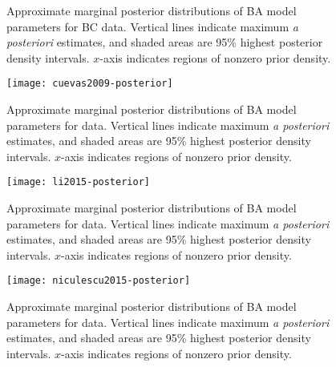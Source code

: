 \clearpage

\begin{figure}[ht]
  \caption[
      Approximate marginal posterior distributions of BA model parameters for
      BC data.
  ]
  {
      Approximate marginal posterior distributions of BA model parameters for
      BC data. Vertical lines indicate maximum \textit{a posteriori} estimates,
      and shaded areas are 95\% highest posterior density intervals. $x$-axis
      indicates regions of nonzero prior density.
  }
  \label{fig:bctree}
\end{figure}

\begin{figure}[ht]
  \texttt{[image: cuevas2009-posterior]}
  \caption[
      Approximate marginal posterior distributions of BA model parameters for
      \textcite{cuevas2009hiv} data. 
  ]{
      Approximate marginal posterior distributions of BA model parameters for
      \textcite{cuevas2009hiv} data. Vertical lines indicate maximum \textit{a
      posteriori} estimates, and shaded areas are 95\% highest posterior
      density intervals. $x$-axis indicates regions of nonzero prior density.
  }
  \label{fig:cuevas}
\end{figure}

\begin{figure}[ht]
  \texttt{[image: li2015-posterior]}
  \caption[
      Approximate marginal posterior distributions of BA model parameters for
      \textcite{li2015hiv} data. 
  ]{
      Approximate marginal posterior distributions of BA model parameters for
      \textcite{li2015hiv} data. Vertical lines indicate maximum \textit{a
      posteriori} estimates, and shaded areas are 95\% highest posterior
      density intervals. $x$-axis indicates regions of nonzero prior density.
  }
  \label{fig:li}
\end{figure}

\begin{figure}[ht]
  \texttt{[image: niculescu2015-posterior]}
  \caption[
      Approximate marginal posterior distributions of BA model parameters for
      \textcite{niculescu2015recent} data.
  ]{
      Approximate marginal posterior distributions of BA model parameters for
      \textcite{niculescu2015recent} data. Vertical lines indicate maximum
      \textit{a posteriori} estimates, and shaded areas are 95\% highest
      posterior density intervals. $x$-axis indicates regions of nonzero prior
      density.
  }
  \label{fig:niculescu}
\end{figure}

